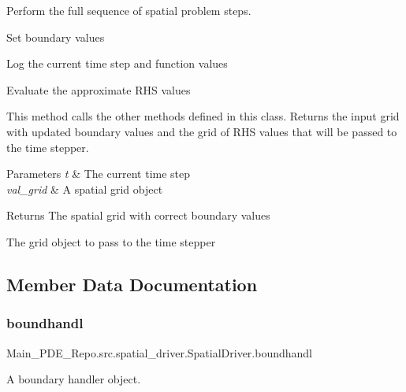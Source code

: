 Perform the full sequence of spatial problem steps. 


\begin{DoxyEnumerate}
\item Set boundary values
\item Log the current time step and function values
\item Evaluate the approximate R\+HS values
\end{DoxyEnumerate}

This method calls the other methods defined in this class. Returns the input grid with updated boundary values and the grid of R\+HS values that will be passed to the time stepper. 
\begin{DoxyParams}{Parameters}
{\em t} & The current time step \\
\hline
{\em val\+\_\+grid} & A spatial grid object \\
\hline
\end{DoxyParams}
\begin{DoxyReturn}{Returns}
The spatial grid with correct boundary values 

The grid object to pass to the time stepper 
\end{DoxyReturn}


\subsection{Member Data Documentation}
\mbox{\label{classMain__PDE__Repo_1_1src_1_1spatial__driver_1_1SpatialDriver_a8e4da2dd5010a3f8e63f2a6aa28ffabf}} 
\subsubsection{\texorpdfstring{boundhandl}{boundhandl}}
{\footnotesize\ttfamily Main\+\_\+\+P\+D\+E\+\_\+\+Repo.\+src.\+spatial\+\_\+driver.\+Spatial\+Driver.\+boundhandl}



A boundary handler object. 

\mbox{\label{classMain__PDE__Repo_1_1src_1_1spatial__driver_1_1SpatialDriver_aac2299eb18270b9cc3c17d2d07e0dc57}} 
